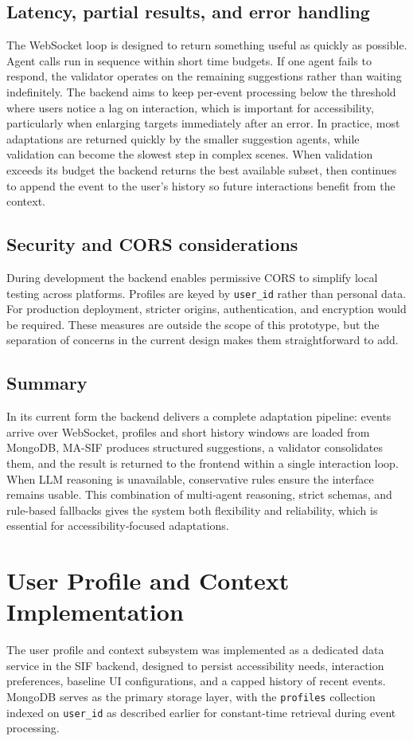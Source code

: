 \documentclass[openany]{book}
\begin{document}
\subsection{Latency, partial results, and error handling}
The WebSocket loop is designed to return something useful as quickly as possible. Agent calls run in sequence within short time budgets. If one agent fails to respond, the validator operates on the remaining suggestions rather than waiting indefinitely. The backend aims to keep per‑event processing below the threshold where users notice a lag on interaction, which is important for accessibility, particularly when enlarging targets immediately after an error. In practice, most adaptations are returned quickly by the smaller suggestion agents, while validation can become the slowest step in complex scenes. When validation exceeds its budget the backend returns the best available subset, then continues to append the event to the user’s history so future interactions benefit from the context.

\subsection{Security and CORS considerations}
During development the backend enables permissive CORS to simplify local testing across platforms. Profiles are keyed by \texttt{user\_id} rather than personal data. For production deployment, stricter origins, authentication, and encryption would be required. These measures are outside the scope of this prototype, but the separation of concerns in the current design makes them straightforward to add.

\subsection{Summary}
In its current form the backend delivers a complete adaptation pipeline: events arrive over WebSocket, profiles and short history windows are loaded from MongoDB, MA-SIF produces structured suggestions, a validator consolidates them, and the result is returned to the frontend within a single interaction loop. When LLM reasoning is unavailable, conservative rules ensure the interface remains usable. This combination of multi‑agent reasoning, strict schemas, and rule-based fallbacks gives the system both flexibility and reliability, which is essential for accessibility‑focused adaptations.

\section{User Profile and Context Implementation}
The user profile and context subsystem was implemented as a dedicated data service in the SIF backend, designed to persist accessibility needs, interaction preferences, baseline UI configurations, and a capped history of recent events. MongoDB serves as the primary storage layer, with the \texttt{profiles} collection indexed on \texttt{user\_id} as described earlier for constant-time retrieval during event processing.
\end{document}
